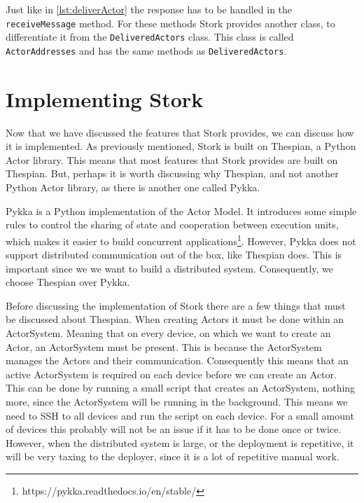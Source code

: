 \documentclass[a4paper]{article}
\begin{document}
Just like in \ref{lst:deliverActor} the response has to be handled in the \lstinline{receiveMessage} method. For these methods Stork provides another class, to differentiate it from the \lstinline|DeliveredActors| class. This class is called \lstinline|ActorAddresses| and has the same methods as \lstinline|DeliveredActors|.
\section{Implementing Stork}
Now that we have discussed the features that Stork provides, we can discuss how it is implemented. As previously mentioned, Stork is built on Thespian, a Python Actor library. This means that most features that Stork provides are built on Thespian. But, perhaps it is worth discussing why Thespian, and not another Python Actor library, as there is another one called Pykka.

Pykka is a Python implementation of the Actor Model. It introduces some simple rules to control the sharing of state and cooperation between execution units, which makes it easier to build concurrent applications\footnote{https://pykka.readthedocs.io/en/stable/}. However, Pykka does not support distributed communication out of the box, like Thespian does. This is important since we we want to build a distributed system. Consequently, we choose Thespian over Pykka.

Before discussing the implementation of Stork there are a few things that must be discussed about Thespian. When creating Actors it must be done within an ActorSystem. Meaning that on every device, on which we want to create an Actor, an ActorSystem must be present. This is because the ActorSystem manages the Actors and their communication. Consequently this means that an active ActorSystem is required on each device before we can create an Actor. This can be done by running a small script that creates an ActorSystem, nothing more, since the ActorSystem will be running in the background. This means we need to SSH to all devices and run the script on each device. For a small amount of devices this probably will not be an issue if it has to be done once or twice. However, when the distributed system is large, or the deployment is repetitive, it will be very taxing to the deployer, since it is a lot of repetitive manual work.
\end{document}
